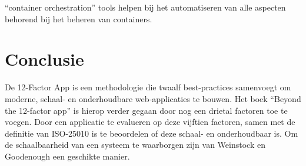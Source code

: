 \enquote{container orchestration} tools helpen bij het automatiseren van alle aspecten behorend bij het beheren van containers.
 
\section{Conclusie}
De 12-Factor App is een methodologie die twaalf best-practices samenvoegt om moderne, schaal- en onderhoudbare web-applicaties te bouwen. Het boek \enquote{Beyond the 12-factor app} \parencite{Beyond12Factor} is hierop verder gegaan door nog een drietal factoren toe te voegen. Door een applicatie te evalueren op deze vijftien factoren, samen met de definitie van ISO-25010 \parencite{ISO25010} is te beoordelen of deze schaal- en onderhoudbaar is. Om de schaalbaarheid van een systeem te waarborgen zijn  van Weinstock en Goodenough \parencite{OnSystemScalability} een geschikte manier.